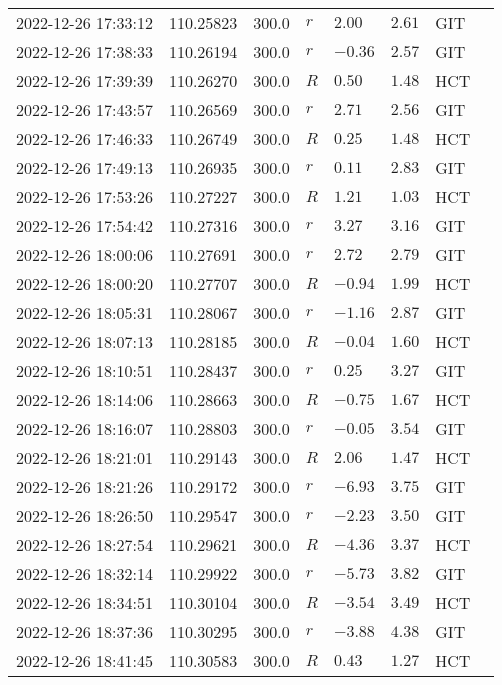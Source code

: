 \documentclass{nature_plusfigure}
\begin{document}
\begin{supplement}
\begin{center}
\begin{longtable}{llllllll}
2022-12-26 17:33:12 & 110.25823 & 300.0 & $r$ & $2.00$ & $2.61$ & GIT &  \\ 
2022-12-26 17:38:33 & 110.26194 & 300.0 & $r$ & $-0.36$ & $2.57$ & GIT &  \\ 
2022-12-26 17:39:39 & 110.26270 & 300.0 & $R$ & $0.50$ & $1.48$ & HCT &  \\ 
2022-12-26 17:43:57 & 110.26569 & 300.0 & $r$ & $2.71$ & $2.56$ & GIT &  \\ 
2022-12-26 17:46:33 & 110.26749 & 300.0 & $R$ & $0.25$ & $1.48$ & HCT &  \\ 
2022-12-26 17:49:13 & 110.26935 & 300.0 & $r$ & $0.11$ & $2.83$ & GIT &  \\ 
2022-12-26 17:53:26 & 110.27227 & 300.0 & $R$ & $1.21$ & $1.03$ & HCT &  \\ 
2022-12-26 17:54:42 & 110.27316 & 300.0 & $r$ & $3.27$ & $3.16$ & GIT &  \\ 
2022-12-26 18:00:06 & 110.27691 & 300.0 & $r$ & $2.72$ & $2.79$ & GIT &  \\ 
2022-12-26 18:00:20 & 110.27707 & 300.0 & $R$ & $-0.94$ & $1.99$ & HCT &  \\ 
2022-12-26 18:05:31 & 110.28067 & 300.0 & $r$ & $-1.16$ & $2.87$ & GIT &  \\ 
2022-12-26 18:07:13 & 110.28185 & 300.0 & $R$ & $-0.04$ & $1.60$ & HCT &  \\ 
2022-12-26 18:10:51 & 110.28437 & 300.0 & $r$ & $0.25$ & $3.27$ & GIT &  \\ 
2022-12-26 18:14:06 & 110.28663 & 300.0 & $R$ & $-0.75$ & $1.67$ & HCT &  \\ 
2022-12-26 18:16:07 & 110.28803 & 300.0 & $r$ & $-0.05$ & $3.54$ & GIT &  \\ 
2022-12-26 18:21:01 & 110.29143 & 300.0 & $R$ & $2.06$ & $1.47$ & HCT &  \\ 
2022-12-26 18:21:26 & 110.29172 & 300.0 & $r$ & $-6.93$ & $3.75$ & GIT &  \\ 
2022-12-26 18:26:50 & 110.29547 & 300.0 & $r$ & $-2.23$ & $3.50$ & GIT &  \\ 
2022-12-26 18:27:54 & 110.29621 & 300.0 & $R$ & $-4.36$ & $3.37$ & HCT &  \\ 
2022-12-26 18:32:14 & 110.29922 & 300.0 & $r$ & $-5.73$ & $3.82$ & GIT &  \\ 
2022-12-26 18:34:51 & 110.30104 & 300.0 & $R$ & $-3.54$ & $3.49$ & HCT &  \\ 
2022-12-26 18:37:36 & 110.30295 & 300.0 & $r$ & $-3.88$ & $4.38$ & GIT &  \\ 
2022-12-26 18:41:45 & 110.30583 & 300.0 & $R$ & $0.43$ & $1.27$ & HCT &  \\ 

\end{longtable}
\end{center}
\end{supplement}
\end{document}
